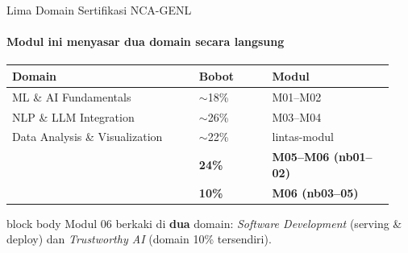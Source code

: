 \documentclass[aspectratio=169,t]{beamer}
\newcommand{\takeaway}[1]{%
  \vspace{0.3em}
  \begin{beamercolorbox}[rounded=true,shadow=false,sep=6pt]{block body}
    \centering\small\color{nvlightgreen}#1
  \end{beamercolorbox}%
}
\begin{document}
\begin{frame}{Lima Domain Sertifikasi NCA-GENL}
  \framesubtitle{Modul ini menyasar dua domain secara langsung}
  \begin{center}
  \renewcommand{\arraystretch}{1.25}{\footnotesize\setlength{\tabcolsep}{6pt}
  \begin{tabular}{@{}p{0.46\linewidth}p{0.18\linewidth}p{0.30\linewidth}@{}}
    \toprule \rowcolor{nvcard!50}
    \textbf{Domain} & \textbf{Bobot} & \textbf{Modul} \\ \midrule
    ML \& AI Fundamentals & $\sim$18\% & M01--M02 \\
    NLP \& LLM Integration & $\sim$26\% & M03--M04 \\
    Data Analysis \& Visualization & $\sim$22\% & lintas-modul \\
    \rowcolor{nvgreen!22}{\color{nvbg}\textbf{Software Development for AI}} & {\color{nvbg}\textbf{24\%}} & {\color{nvbg}\textbf{M05--M06 (nb01--02)}} \\
    \rowcolor{nvblue!28}{\color{nvbg}\textbf{Trustworthy AI}} & {\color{nvbg}\textbf{10\%}} & {\color{nvbg}\textbf{M06 (nb03--05)}} \\
    \bottomrule
  \end{tabular}}
  \end{center}
  \takeaway{Modul 06 berkaki di \textbf{dua} domain: \emph{Software Development} (serving \& deploy) dan \emph{Trustworthy AI} (domain 10\% tersendiri).}
\end{frame}
\end{document}
